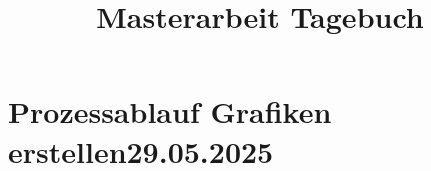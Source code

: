 \documentclass{article}
\title{\Huge Masterarbeit Tagebuch}
\begin{document}
\maketitle
\noindent
\hrulefill

\newpage %
\tableofcontents




\noindent\hrulefill
\section{Prozessablauf Grafiken erstellen\small 29.05.2025}
\end{document}
